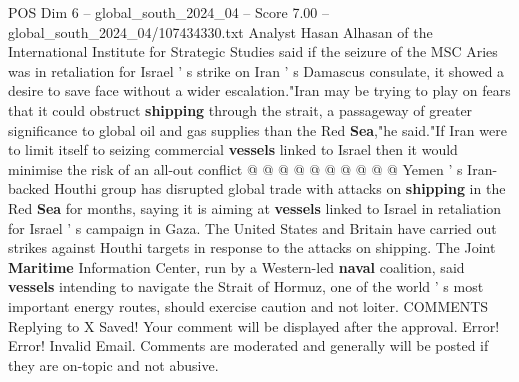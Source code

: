 \begin{textsample}{POS Dim 6 – global\_south\_2024\_04 – Score 7.00 – global\_south\_2024\_04/107434330.txt}
Analyst Hasan Alhasan of the International Institute for Strategic Studies said if the seizure of the MSC Aries was in retaliation for Israel ' s strike on Iran ' s Damascus consulate, it showed a desire to save face without a wider escalation."Iran may be trying to play on fears that it could obstruct \textbf{shipping} through the strait, a passageway of greater significance to global oil and gas supplies than the Red \textbf{Sea},"he said."If Iran were to limit itself to seizing commercial \textbf{vessels} linked to Israel then it would minimise the risk of an all-out conflict @ @ @ @ @ @ @ @ @ @ Yemen ' s Iran-backed Houthi group has disrupted global trade with attacks on \textbf{shipping} in the Red \textbf{Sea} for months, saying it is aiming at \textbf{vessels} linked to Israel in retaliation for Israel ' s campaign in Gaza.
The United States and Britain have carried out strikes against Houthi targets in response to the attacks on shipping.
The Joint \textbf{Maritime} Information Center, run by a Western-led \textbf{naval} coalition, said \textbf{vessels} intending to navigate the Strait of Hormuz, one of the world ' s most important energy routes, should exercise caution and not loiter.
COMMENTS Replying to X Saved!
Your comment will be displayed after the approval.
Error!
Error!
Invalid Email.
Comments are moderated and generally will be posted if they are on-topic and not abusive.

\end{textsample}
